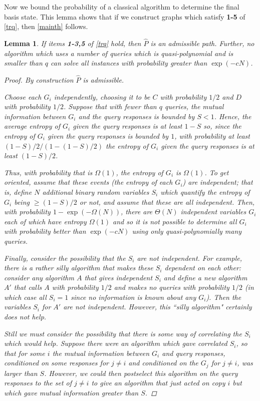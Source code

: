 \documentclass[letterpaper,onecolumn]{quantumarticle}
\newtheorem{lemma}{Lemma}
\begin{document}
Now we bound the probability of a classical algorithm to determine the final basis state. 
This lemma shows that if we construct graphs which satisfy {\bf 1-5} of \cref{trq}, then \cref{mainth} follows. 
\begin{lemma}
\label{blemma}
If items {\bf 1-3,5} of \cref{trq} hold, then $\hat P$ is an admissible path.
Further,
 no algorithm 
 which uses a number of queries which is quasi-polynomial and is smaller than $q$
can solve all instances with probability greater than $\exp(-cN)$.
\begin{proof}
By construction $\hat P$ is admissible.

Choose each $G_i$ independently, choosing it to be $C$ with probability $1/2$ and $D$ with probability $1/2$.
Suppose that with fewer than $q$ queries, the mutual information between $G_i$ and the query responses is bounded by $S<1$.
Hence, the average entropy of $G_i$ given the query responses is at least $1-S$ so, since the entropy of $G_i$ given the query responses is bounded by $1$, with probability at least $(1-S)/2/(1-(1-S)/2)$
the entropy of $G_i$ given the query responses is at least $(1-S)/2$.

Thus, with probability that is $\Omega(1)$, the entropy of $G_i$ is $\Omega(1)$.
To get oriented, assume that these events (the entropy of each $G_i$) are independent; that is, define $N$ additional binary random variables $S_i$ which quantify the entropy of $G_i$ being $\geq (1-S)/2$ or not, and assume that these are all independent.
Then, with probability $1-\exp(-\Omega(N))$, there are $\Theta(N)$ independent variables $G_i$ each of which have entropy $\Omega(1)$ and
so it is not possible to determine all $G_i$ with probability better than $\exp(-cN)$ using only quasi-polynomially many queries.

Finally, consider the possibility that the $S_i$ are not independent.  For example, there is a rather silly algorithm that makes these $S_i$ dependent on each other: consider any algorithm $A$ that gives independent $S_i$ and define a new algorithm $A'$ that calls $A$ with probability $1/2$ and makes no queries with probability $1/2$ (in which case all $S_i=1$ since no information is known about any $G_i$).  Then the variables $S_i$ for $A'$ are not independent.  However, this ``silly algorithm" certainly does not help.

Still we must consider the possibility that there is some way of correlating the $S_i$ which would help.  
Suppose there were an algorithm which gave correlated $S_i$, so that for some $i$
the mutual information between $G_i$ and query responses,
conditioned on some responses for $j\neq i$ and conditioned on the $G_j$ for $j\neq i$, was larger than $S$.  However, we could then postselect this algorithm on the query responses to the set of $j \neq i$ to give an algorithm that just acted on copy $i$ but which gave mutual information greater than $S$.
\end{proof}
\end{lemma}
\end{document}
